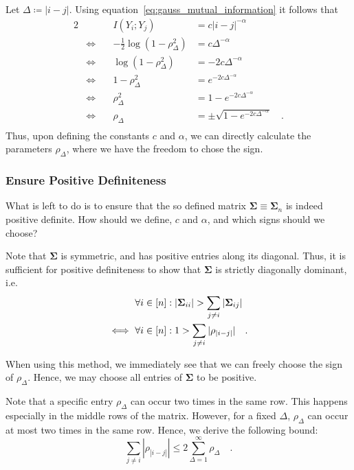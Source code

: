 \documentclass[../../main.tex]{subfiles}
\begin{document}
Let $\Delta \coloneqq |i-j|$. Using equation~\eqref{eq:gauss_mutual_information} it follows that
\begin{alignat*}{2}
    && I(Y_i; Y_j) &= c |i-j|^{-\alpha} \\
    & \iff \quad & -\frac{1}{2}\log(1-\rho_\Delta^2) &= c \Delta^{-\alpha} \\
    & \iff \quad & \log(1-\rho_\Delta^2) &= -2c \Delta^{-\alpha} \\
    & \iff \quad & 1-\rho_\Delta^2 &= e^{-2c \Delta^{-\alpha}} \\
    & \iff \quad & \rho_\Delta^2 &= 1 - e^{-2c \Delta^{-\alpha}} \\
    & \iff \quad & \rho_\Delta &= \pm \sqrt{1 - e^{-2c \Delta^{-\alpha}}} \quad . \\
\end{alignat*}
Thus, upon defining the constants $c$ and $\alpha$, we can directly calculate the parameters $\rho_\Delta$, where we have the freedom to chose the sign.

\subsubsection{Ensure Positive Definiteness}
What is left to do is to ensure that the so defined matrix $\bm{\Sigma} \equiv \bm{\Sigma}_n$ is indeed positive definite. How should we define, $c$ and $\alpha$, and which signs should we choose?

Note that $\bm{\Sigma}$ is symmetric, and has positive entries along its diagonal. Thus, it is sufficient for positive definiteness to show that $\bm{\Sigma}$ is strictly diagonally dominant, i.e.
\begin{align}
    &\forall i \in [n]: |\bm{\Sigma}_{ii}| > \sum_{j \neq i} |\bm{\Sigma}_{ij}| \notag \\
    \iff \ &\forall i \in [n]: 1 > \sum_{j \neq i} |\rho_{|i-j|}| \quad . \label{eq:diagonal_dominant}
\end{align}

When using this method, we immediately see that we can freely choose the sign of $\rho_\Delta$. Hence, we may choose all entries of $\bm{\Sigma}$ to be positive.

Note that a specific entry $\rho_\Delta$ can occur two times in the same row. This happens especially in the middle rows of the matrix. However, for a fixed $\Delta$, $\rho_\Delta$ can occur at most two times in the same row. Hence, we derive the following bound:
\begin{equation}
    \sum_{j \neq i} |\rho_{|i-j|}| \leq 2 \sum_{\Delta = 1}^{\infty} \rho_\Delta \quad . \label{eq:diagonal_dominant_sufficient}
\end{equation}
\end{document}
